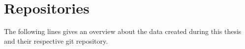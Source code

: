 \chapter{Repositories}
The following lines gives an overview about the data created during this thesis and their respective git repository.


